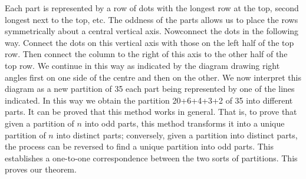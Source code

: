 Each part is represented by a row of dots with the longest row at the
top, second longest next to the top, etc. The oddness of the parts
allows us to place the rows symmetrically about a central vertical
axis. Now\pageoriginale  connect the dots in the following way. Connect the dots on
this vertical axis with those on the left half of the top row. Then
connect the column to the right of this axis to the other half of the
top row. We continue in this way as indicated by the diagram drawing
right angles first on one side of the centre and then on the other. We
now interpret this diagram as a new partition of 35 each part being
represented by one of the lines indicated. In this way we obtain the
partition 20+6+4+3+2 of 35 into different parts. It can be proved that
this method works in general. That is, to prove that given a partition
of $n$ into odd parts, this method transforms it into a unique
partition of $n$ into distinct parts; conversely, given a partition
into distinct parts, the process can be reversed to find a unique
partition into odd parts. This establishes a one-to-one correspondence
between the two sorts of partitions. This proves our theorem.




